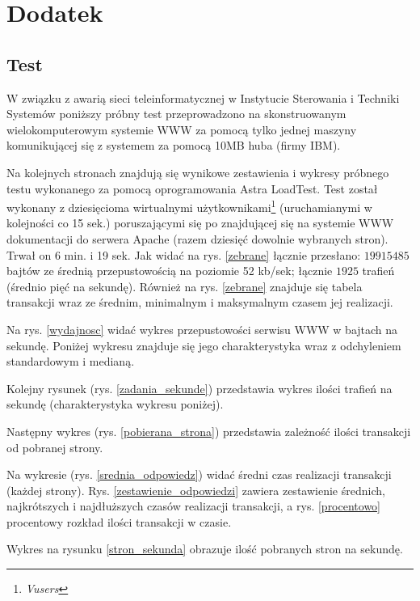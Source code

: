 \chapter*{Dodatek}

\section*{Test}

W związku z awarią sieci teleinformatycznej w Instytucie Sterowania i Techniki Systemów poniższy 
próbny test przeprowadzono 
na skonstruowanym wielokomputerowym systemie WWW za pomocą tylko jednej maszyny komunikującej się z 
systemem za pomocą 10MB huba (firmy IBM). 

Na kolejnych stronach znajdują się wynikowe zestawienia i wykresy próbnego testu wykonanego za 
pomocą oprogramowania Astra LoadTest. Test został wykonany z dziesięcioma wirtualnymi 
użytkownikami\footnote{\emph{Vusers}} (uruchamianymi w kolejności co 15 sek.) poruszającymi się po 
znajdującej się na systemie WWW dokumentacji do serwera Apache (razem dziesięć dowolnie wybranych 
stron). Trwał on 6 min. i 19 sek. Jak widać na rys. \ref{zebrane} łącznie przesłano: $19 915 485$ 
bajtów ze średnią przepustowością na poziomie 52 kb/sek; łącznie $1 925$ trafień (średnio pięć na 
sekundę). Również na rys. \ref{zebrane} znajduje się tabela transakcji wraz ze średnim, minimalnym 
i maksymalnym czasem jej realizacji.

Na rys. \ref{wydajnosc} widać wykres przepustowości serwisu WWW w bajtach na sekundę. Poniżej wykresu 
znajduje się jego charakterystyka wraz z odchyleniem standardowym i medianą.

Kolejny rysunek (rys. \ref{zadania_sekunde}) przedstawia wykres ilości trafień na sekundę 
(charakterystyka wykresu poniżej).

Następny wykres (rys. \ref{pobierana_strona}) przedstawia zależność ilości transakcji od pobranej strony.

Na wykresie (rys. \ref{srednia_odpowiedz}) widać średni czas realizacji transakcji (każdej strony). 
Rys. \ref{zestawienie_odpowiedzi} zawiera zestawienie średnich, najkrótszych i najdłuższych czasów 
realizacji transakcji, a rys. \ref{procentowo} procentowy rozkład ilości transakcji w czasie.

Wykres na rysunku \ref{stron_sekunda} obrazuje ilość pobranych stron na sekundę.

